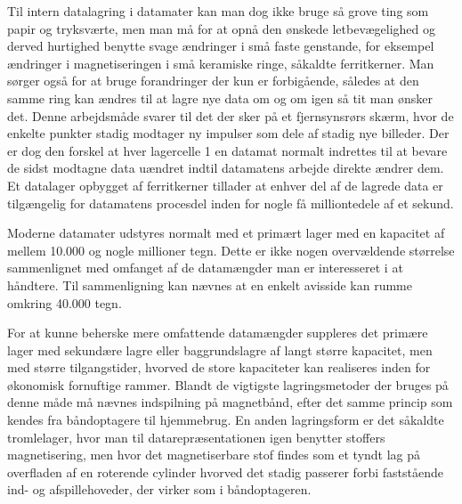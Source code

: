 {Til intern datalagring i datamater kan man dog ikke bruge så grove ting som papir og tryksværte, men man må for at opnå den ønskede letbevægelighed og derved hurtighed benytte svage ændringer i små faste genstande, for eksempel ændringer i magnetiseringen i små keramiske ringe, såkaldte ferritkerner. Man sørger også for at bruge forandringer der kun er forbigående, således at den samme ring kan ændres til at lagre nye data om og om igen så tit man ønsker det. Denne arbejdsmåde svarer til det der sker på et fjernsynsrørs skærm, hvor de enkelte punkter stadig modtager ny impulser som dele af stadig nye billeder. Der er dog den forskel at hver lagercelle 1 en datamat normalt indrettes til at bevare de sidst modtagne data uændret indtil datamatens arbejde direkte ændrer dem. Et datalager opbygget af ferritkerner tillader at enhver del af de lagrede data er tilgængelig for datamatens procesdel inden for nogle få milliontedele af et sekund. 

Moderne datamater udstyres normalt med et primært lager med en kapacitet af mellem 10.000 og nogle millioner tegn. Dette er ikke nogen overvældende størrelse sammenlignet med omfanget af de datamængder man er interesseret i at håndtere. Til sammenligning kan nævnes at en enkelt avisside kan rumme omkring 40.000 tegn. 

For at kunne beherske mere omfattende datamængder suppleres det primære lager med sekundære lagre eller baggrundslagre af langt større kapacitet, men med større tilgangstider, hvorved de store kapaciteter kan realiseres inden for økonomisk fornuftige rammer. Blandt de vigtigste lagringsmetoder der bruges på denne måde må nævnes indspilning på magnetbånd, efter det samme princip som kendes fra båndoptagere til hjemmebrug. En anden lagringsform er det såkaldte tromlelager, hvor man til datarepræsentationen igen benytter stoffers magnetisering, men hvor det magnetiserbare stof findes som et tyndt lag på overfladen af en roterende cylinder hvorved det stadig passerer forbi faststående ind- og afspillehoveder, der virker som i båndoptageren. 

}
